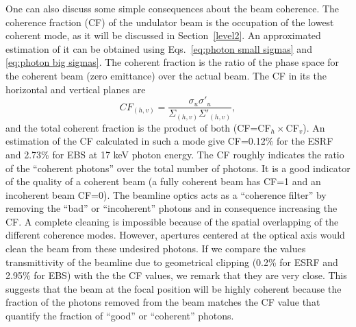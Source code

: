 \documentclass{iucr}              %
\begin{document}
One can also discuss some simple consequences about the beam coherence. The coherence fraction (CF) \cite{arxivCF} of the undulator beam is the occupation of the lowest coherent mode, as it will be discussed in Section~\ref{level2}. An approximated estimation of it can be obtained using Eqs.~\ref{eq:photon small sigmas} and \ref{eq:photon big sigmas}. The coherent fraction is the ratio of the phase space for the coherent beam (zero emittance) over the actual beam. The CF in its the horizontal and vertical planes are
\begin{equation}\label{eq:coherent fraction}
 CF_{(h,v)} = \frac{\sigma_u \sigma'_u}{\Sigma_{(h,v)} \Sigma'_{(h,v)}},
\end{equation}
and the total coherent fraction is the product of both (CF=CF$_h \times $CF$_v$). An estimation of the CF calculated in such a mode give CF=0.12\% for the ESRF and 2.73\% for EBS at 17 keV photon energy. The CF roughly indicates the ratio of the ``coherent photons'' over the total number of photons. It is a good indicator of the quality of a coherent beam (a fully coherent beam has CF=1 and an incoherent beam CF=0). The beamline optics acts as a ``coherence filter'' by removing the ``bad'' or ``incoherent'' photons and in consequence increasing the CF. A complete cleaning is impossible because of the spatial overlapping of the different coherence modes. However, apertures centered at the optical axis would clean the beam from these undesired photons. If we compare the values transmittivity of the beamline due to geometrical clipping  (0.2\% for ESRF and 2.95\% for EBS) with the the CF values, we remark that they are very close. This suggests that the beam at the focal position will be highly coherent because the fraction of the photons removed from the beam matches the CF value that quantify the fraction of ``good'' or ``coherent'' photons. 
\end{document}
